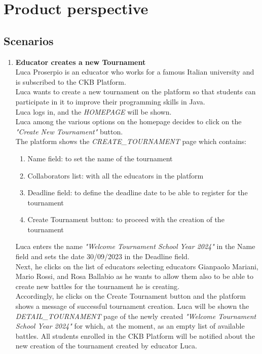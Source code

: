 \section{Product perspective}
\subsection{Scenarios}

\begin{enumerate}
	\item \textbf{Educator creates a new Tournament}\\
	      Luca Proserpio is an educator who works for a famous Italian university and is subscribed to the CKB Platform.\\
	      Luca wants to create a new tournament on the platform so that students can participate in it to improve their programming skills in Java.\\
	      Luca logs in, and the \emph{HOMEPAGE} will be shown.\\
	      Luca among the various options on the homepage decides to click on the \emph{"Create New Tournament"} button. \\
	      The platform shows the \emph{CREATE\_TOURNAMENT} page which contains:

	      \begin{enumerate}
		      \item Name field: to set the name of the tournament
		      \item Collaborators list: with all the educators in the platform
		      \item Deadline field: to define the deadline date to be able to register for the tournament
		      \item Create Tournament button: to proceed with the creation of the tournament
	      \end{enumerate}

	      Luca enters the name \emph{"Welcome Tournament School Year 2024"} in the Name field and sets the date 30/09/2023 in the Deadline field.\\
	      Next, he clicks on the list of educators selecting educators Gianpaolo Mariani, Mario Rossi, and Rosa Ballabio as he wants to allow them also to be able to create new
	      battles for the tournament he is creating.\\
	      Accordingly, he clicks on the Create Tournament button and the platform shows a message of successful tournament creation.
	      Luca will be shown the \emph{DETAIL\_TOURNAMENT} page of the newly created \emph{"Welcome Tournament School Year 2024"} for which, at the moment, as an empty list of
	      available
	      battles.
	      All students enrolled in the CKB Platform will be notified about the new creation of the tournament created by educator Luca.


\end{enumerate}
